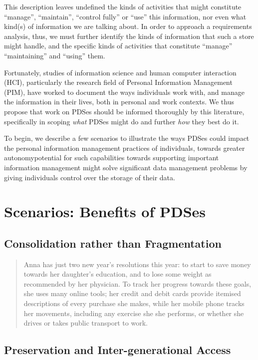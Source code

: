 \documentclass[runningheads,a4paper]{llncs}
\begin{document}
This description leaves undefined the kinds of activities that might constitute ``manage'', ``maintain'', ``control fully'' or ``use'' this information, nor even what kind(s) of information we are talking about.  In order to approach a requirements analysis, thus, we must further identify the kinds of information that such a store might handle, and the specific kinds of activities that constitute ``manage'' ``maintaining'' and ``using'' them. 

Fortunately, studies of information science and human computer interaction (HCI), particularly the research field of Personal Information Management (PIM), have worked to document the ways individuals work with, and manage the information in their lives, both in personal and work contexts.  We thus propose that work on PDSes should be informed thoroughly by this literature, specifically in scoping \emph{what} PDSes might do and further \emph{how} they best do it.

To begin, we describe a few scenarios to illustrate the ways PDSes could impact the personal information management practices of individuals, towards greater autonomypotential for such capabilities towards supporting important information management  might solve significant data management problems by giving individuals control over the storage of their data.

\section{Scenarios: Benefits of PDSes}

\subsection{Consolidation rather than Fragmentation}

\begin{quote}
Anna has just two new year's resolutions this year: to start to save money towards her daughter's education, and to lose some weight as recommended by her physician.  To track her progress towards these goals, she uses many online tools; her credit and debit cards provide itemised descriptions of every purchase she makes, while her mobile phone tracks her movements, including any exercise she she performs, or whether she drives or takes public transport to work.

\end{quote}

\subsection{Preservation and Inter-generational Access}
\end{document}
